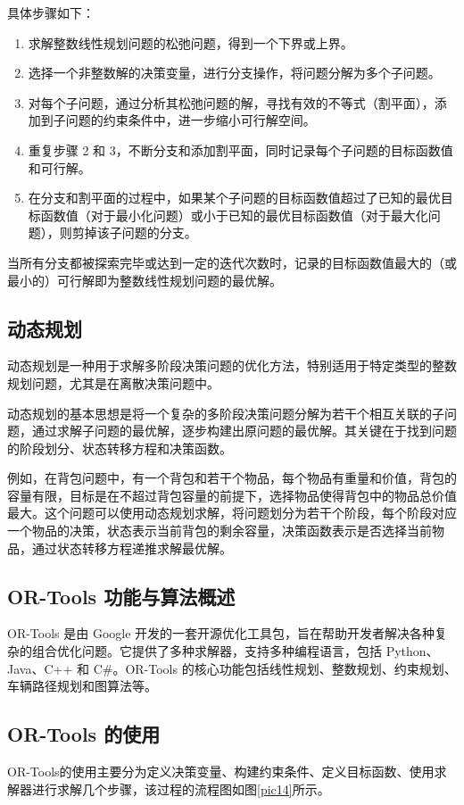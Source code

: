\documentclass[bachelor]{thesis-uestc}
\begin{document}
具体步骤如下：
\begin{enumerate}
    \item 求解整数线性规划问题的松弛问题，得到一个下界或上界。
    \item 选择一个非整数解的决策变量，进行分支操作，将问题分解为多个子问题。
    \item 对每个子问题，通过分析其松弛问题的解，寻找有效的不等式（割平面），添加到子问题的约束条件中，进一步缩小可行解空间。
    \item 重复步骤 2 和 3，不断分支和添加割平面，同时记录每个子问题的目标函数值和可行解。
    \item 在分支和割平面的过程中，如果某个子问题的目标函数值超过了已知的最优目标函数值（对于最小化问题）或小于已知的最优目标函数值（对于最大化问题），则剪掉该子问题的分支。
\end{enumerate}

当所有分支都被探索完毕或达到一定的迭代次数时，记录的目标函数值最大的（或最小的）可行解即为整数线性规划问题的最优解。

\subsection{动态规划}
动态规划是一种用于求解多阶段决策问题的优化方法，特别适用于特定类型的整数规划问题，尤其是在离散决策问题中。


动态规划的基本思想是将一个复杂的多阶段决策问题分解为若干个相互关联的子问题，通过求解子问题的最优解，逐步构建出原问题的最优解。其关键在于找到问题的阶段划分、状态转移方程和决策函数。


例如，在背包问题中，有一个背包和若干个物品，每个物品有重量和价值，背包的容量有限，目标是在不超过背包容量的前提下，选择物品使得背包中的物品总价值最大。这个问题可以使用动态规划求解，将问题划分为若干个阶段，每个阶段对应一个物品的决策，状态表示当前背包的剩余容量，决策函数表示是否选择当前物品，通过状态转移方程递推求解最优解。

\subsection{OR-Tools 功能与算法概述}
OR-Tools 是由 Google 开发的一套开源优化工具包，旨在帮助开发者解决各种复杂的组合优化问题。它提供了多种求解器，支持多种编程语言，包括 Python、Java、C++ 和 C\#。OR-Tools 的核心功能包括线性规划、整数规划、约束规划、车辆路径规划和图算法等。

\subsection{OR-Tools 的使用}
OR-Tools的使用主要分为定义决策变量、构建约束条件、定义目标函数、使用求解器进行求解几个步骤，该过程的流程图如图\ref{pic14}所示。
\end{document}
